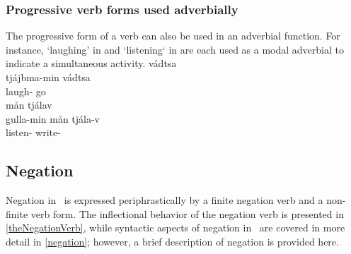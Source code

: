 \subsubsection{Progressive verb forms used adverbially}\label{ADVverbs}
The progressive form of a verb can also be used in an adverbial function. For instance,  ‘laughing’ in  and  ‘listening‘ in  are each used as a modal adverbial to indicate a simultaneous activity. 
\ea\label{ADVverbsEx1}%
 vádtsa\\
	tjájbma-min vádtsa\\
	laugh- go\BS{}\\\nopagebreak
{}	
\z
\ea\label{ADVverbsEx2}%
 mån tjálav\\
	gulla-min mån tjála-v\\
	listen-  write-\\\nopagebreak
{}	
\z



\subsection{Negation}\label{negationVerb}
Negation in \PS\ is expressed periphrastically by a finite negation verb and a non-finite verb form. The inflectional behavior of the negation verb is presented in \SEC\ref{theNegationVerb}, while syntactic aspects of negation in \PS\ are covered in more detail in \SEC\ref{negation}; however, a brief description of negation is provided here. 

